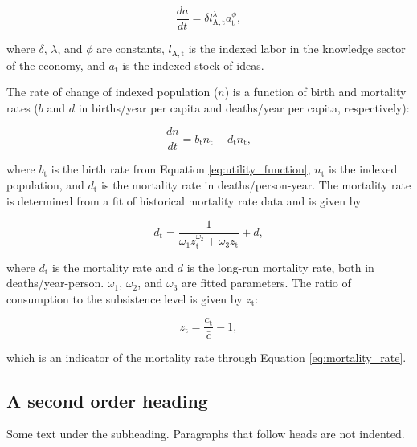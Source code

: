\documentclass[letterpaper,12pt]{article}
\begin{document}
\begin{equation} \label{eq:da_dt}
	\frac{da}{dt} = \delta l_\mathrm{A,t}^\lambda a_\mathrm{t}^\phi,
\end{equation}

\noindent where $\delta$, $\lambda$, and $\phi$ are constants, $l_\mathrm{A,t}$ is the indexed labor in the knowledge sector of the economy, and $a_\mathrm{t}$ is the indexed stock of ideas.

The rate of change of indexed population ($n$) is a function of birth and mortality rates ($b$ and $d$ in births/year per capita and deaths/year per capita, respectively):

\begin{equation} \label{eq:dn_dt}
	\frac{dn}{dt} = b_\mathrm{t} n_\mathrm{t} - d_\mathrm{t} n_\mathrm{t},
\end{equation}

\noindent where $b_\mathrm{t}$ is the birth rate from Equation \ref{eq:utility_function}, $n_\mathrm{t}$ is the indexed population, and $d_\mathrm{t}$ is the mortality rate in deaths/person-year. The mortality rate is determined from a fit of historical mortality rate data \citep{Jones:2001wn} and is given by

\begin{equation} \label{eq:mortality_rate}
	d_\mathrm{t} = \frac{1}{\omega_\mathrm{1} z_\mathrm{t}^{\omega_\mathrm{2}} + \omega_\mathrm{3} z_\mathrm{t}} + \bar d,
\end{equation}

\noindent where $d_\mathrm{t}$ is the mortality rate and $\bar d$ is the long-run mortality rate, both in deaths/year-person. $\omega_\mathrm{1}$, $\omega_\mathrm{2}$, and $\omega_\mathrm{3}$ are fitted parameters. The ratio of consumption to the subsistence level is given by $z_\mathrm{t}$:

\begin{equation} \label{eq:z}
	z_\mathrm{t} = \frac{c_\mathrm{t}}{\bar c} - 1, 
\end{equation}

\noindent which is an indicator of the mortality rate through Equation \ref{eq:mortality_rate}.


\subsection{A second order heading}

Some text under the subheading. Paragraphs that follow heads are not
indented.
\end{document}
